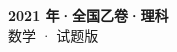 \documentclass[zihao=-4, a4paper]{ctexart}
\begin{document}
\begin{center}
  {\Large\bfseries 2021 年·全国乙卷·理科}\\[4pt]
  {\large 数学 · 试题版}
\end{center}
\medskip
{}

\end{document}
